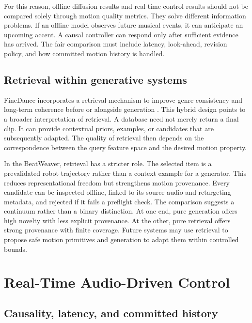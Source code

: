 For this reason, offline diffusion results and real-time control results should
not be compared solely through motion quality metrics. They solve different
information problems. If an offline model observes future musical events, it
can anticipate an upcoming accent. A causal controller can respond only after
sufficient evidence has arrived. The fair comparison must include latency,
look-ahead, revision policy, and how committed motion history is handled.

\subsection{Retrieval within generative systems}
\label{subsec:lit_retrieval_generation}

FineDance incorporates a retrieval mechanism to improve genre consistency and
long-term coherence before or alongside generation \cite{li2023finedance}.
This hybrid design points to a broader interpretation of retrieval. A database
need not merely return a final clip. It can provide contextual priors, examples,
or candidates that are subsequently adapted. The quality of retrieval then
depends on the correspondence between the query feature space and the desired
motion property.

In the BeatWeaver, retrieval has a stricter role. The selected item is a
prevalidated robot trajectory rather than a context example for a generator.
This reduces representational freedom but strengthens motion provenance. Every
candidate can be inspected offline, linked to its source audio and retargeting
metadata, and rejected if it fails a preflight check. The comparison suggests a
continuum rather than a binary distinction. At one end, pure generation offers
high novelty with less explicit provenance. At the other, pure retrieval offers
strong provenance with finite coverage. Future systems may use retrieval to
propose safe motion primitives and generation to adapt them within controlled
bounds.

\section{Real-Time Audio-Driven Control}
\label{sec:lit_realtime_control}

\subsection{Causality, latency, and committed history}
\label{subsec:lit_causality}

